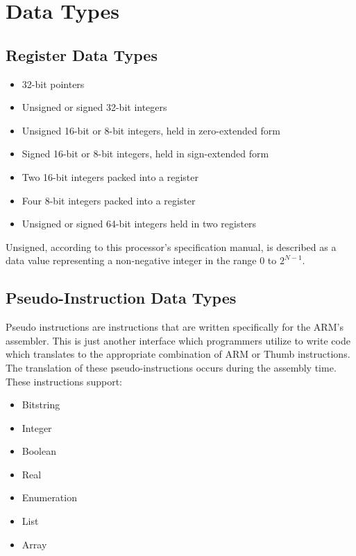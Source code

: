 \documentclass[12pt]{scrreprt}
\begin{document}
{\let\clearpage\relax\chapter{Data Types}}

	\section{Register Data Types}

	\begin{itemize}
		\item{32-bit pointers}
		\item{Unsigned or signed 32-bit integers}
		\item{Unsigned 16-bit or 8-bit integers, held in zero-extended form}
		\item{Signed 16-bit or 8-bit integers, held in sign-extended form}
		\item{Two 16-bit integers packed into a register}
		\item{Four 8-bit integers packed into a register}
		\item{Unsigned or signed 64-bit integers held in two registers}
	\end{itemize}

	Unsigned, according to this processor's specification manual, is described as a data value representing a non-negative integer in the range $0$ to $2^{N-1}$.

	\section{Pseudo-Instruction Data Types}

	Pseudo instructions are instructions that are written specifically for the ARM's assembler.
	This is just another interface which programmers utilize to write code which translates to the appropriate combination of ARM or Thumb instructions.
	The translation of these pseudo-instructions occurs during the assembly time.
	These instructions support:

	\begin{itemize}
		\item{Bitstring}
		\item{Integer}
		\item{Boolean}
		\item{Real}
		\item{Enumeration}
		\item{List}
		\item{Array}
	\end{itemize}
\end{document}
